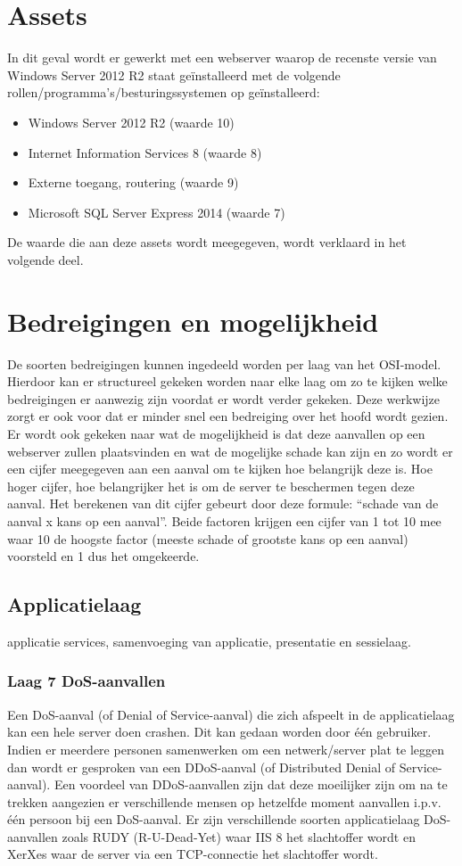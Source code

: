 \documentclass[pdftex,a4paper,12pt]{report}
\begin{document}
\section{Assets}
In dit geval wordt er gewerkt met een webserver waarop de recenste versie van Windows Server 2012 R2 staat geïnstalleerd met de volgende rollen/programma's/besturingssystemen op geïnstalleerd:
\begin{itemize}
	\item Windows Server 2012 R2 (waarde 10)
	\item Internet Information Services 8 (waarde 8)
	\item Externe toegang, routering (waarde 9)
	\item Microsoft SQL Server Express 2014 (waarde 7)
\end{itemize}
De waarde die aan deze assets wordt meegegeven, wordt verklaard in het volgende deel.

\section{Bedreigingen en mogelijkheid}
De soorten bedreigingen kunnen ingedeeld worden per laag van het OSI-model. Hierdoor kan er structureel gekeken worden naar elke laag om zo te kijken welke bedreigingen er aanwezig zijn voordat er wordt verder gekeken. Deze werkwijze zorgt er ook voor dat er minder snel een bedreiging over het hoofd wordt gezien. Er wordt ook gekeken naar wat de mogelijkheid is dat deze aanvallen op een webserver zullen plaatsvinden en wat de mogelijke schade kan zijn en zo wordt er een cijfer meegegeven aan een aanval om te kijken hoe belangrijk deze is. Hoe hoger cijfer, hoe belangrijker het is om de server te beschermen tegen deze aanval. Het berekenen van dit cijfer gebeurt door deze formule: "`schade van de aanval x kans op een aanval"'. Beide factoren krijgen een cijfer van 1 tot 10 mee waar 10 de hoogste factor (meeste schade of grootste kans op een aanval) voorsteld en 1 dus het omgekeerde. \citep{Sim2005}

\subsection{Applicatielaag}
applicatie services, samenvoeging van applicatie, presentatie en sessielaag.
\subsubsection{Laag 7 DoS-aanvallen}
Een DoS-aanval (of Denial of Service-aanval) die zich afspeelt in de applicatielaag kan een hele server doen crashen. Dit kan gedaan worden door één gebruiker. Indien er meerdere personen samenwerken om een netwerk/server plat te leggen dan wordt er gesproken van een DDoS-aanval (of Distributed Denial of Service-aanval). Een voordeel van DDoS-aanvallen zijn dat deze moeilijker zijn om na te trekken aangezien er verschillende mensen op hetzelfde moment aanvallen i.p.v. één persoon bij een DoS-aanval. \citep{Blagov2014} Er zijn verschillende soorten applicatielaag DoS-aanvallen zoals RUDY (R-U-Dead-Yet) waar IIS 8 het slachtoffer wordt en XerXes waar de server via een TCP-connectie het slachtoffer wordt. \newline
\end{document}
